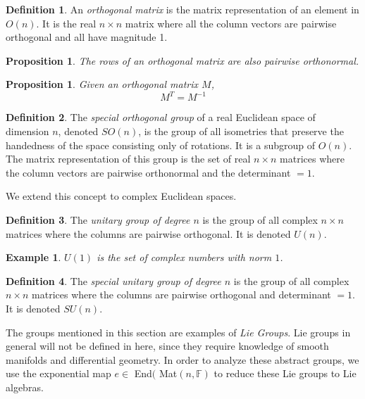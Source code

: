 \documentclass{article}
\newtheorem{proposition}[theorem]{Proposition}
\newtheorem{example}{Example}[section]
\theoremstyle{remark}
\theoremstyle{definition}
\newtheorem{definition}{Definition}[section]
\begin{document}
    \begin{definition}
    An \textit{orthogonal matrix} is the matrix representation of an element in $O(n)$. It is the real $n \times n$ matrix where all the column vectors are pairwise orthogonal and all have magnitude 1. 
    \end{definition}

    \begin{proposition}
    The rows of an orthogonal matrix are also pairwise orthonormal.
    \end{proposition}

    \begin{proposition}
    Given an orthogonal matrix $M$,
    \[M^T = M^{-1}\]
    \end{proposition}

    \begin{definition}
    The \textit{special orthogonal group} of a real Euclidean space of dimension $n$, denoted $SO(n)$, is the group of all isometries that preserve the handedness of the space consisting only of rotations. It is a subgroup of $O(n)$. The matrix representation of this group is the set of real $n \times n$ matrices where the column vectors are pairwise orthonormal and the determinant $=1$. 
    \end{definition}

    We extend this concept to complex Euclidean spaces. 

    \begin{definition}
    The \textit{unitary group of degree $n$} is the group of all complex $n \times n$ matrices where the columns are pairwise orthogonal. It is denoted $U(n)$. 
    \end{definition}

    \begin{example}
    $U(1)$ is the set of complex numbers with norm $1$. 
    \end{example}

    \begin{definition}
    The \textit{special unitary group of degree $n$} is the group of all complex $n \times n$ matrices where the columns are pairwise orthogonal and determinant $=1$. It is denoted $SU(n)$. 
    \end{definition}

    The groups mentioned in this section are examples of \textit{Lie Groups}. Lie groups in general will not be defined in here, since they require knowledge of smooth manifolds and differential geometry. In order to analyze these abstract groups, we use the exponential map $e \in$ End$($ Mat$(n, \mathbb{F})$ to reduce these Lie groups to Lie algebras.
\end{document}
